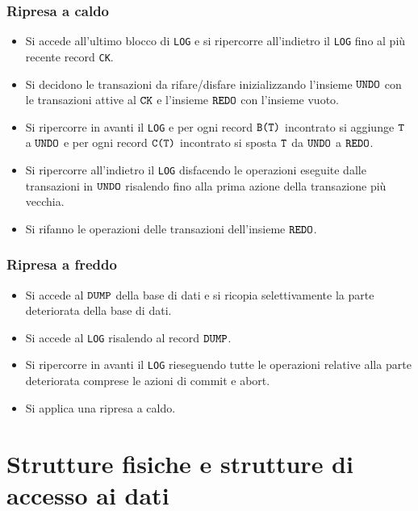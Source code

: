 \documentclass[oneside,a4paper,11pt]{book}
\theoremstyle{italicstyle}
\theoremstyle{normStyle}
\begin{document}
\subsection{Ripresa a caldo}
\begin{itemize}
    \item Si accede all'ultimo blocco di \verb|LOG| e si ripercorre all'indietro il \verb|LOG| 
    fino al più recente record \verb|CK|.
    \item Si decidono le transazioni da rifare/disfare inizializzando l'insieme $\verb|UNDO|$ con 
    le transazioni attive al $\verb|CK|$ e l'insieme $\verb|REDO|$ con l'insieme vuoto.
    \item Si ripercorre in avanti il \verb|LOG| e per ogni record $\verb|B(T)|$ incontrato 
    si aggiunge $\verb|T|$ a $\verb|UNDO|$ e per ogni record $\verb|C(T)|$ incontrato si sposta $\verb|T|$ da $\verb|UNDO|$ a $\verb|REDO|$.
    \item Si ripercorre all’indietro il \verb|LOG| disfacendo le operazioni eseguite dalle transazioni in 
    $\verb|UNDO|$ risalendo fino alla prima azione della transazione più vecchia.
    \item Si rifanno le operazioni delle transazioni dell'insieme $\verb|REDO|$.
\end{itemize}
\subsection{Ripresa a freddo}
\begin{itemize}
    \item Si accede al $\verb|DUMP|$ della base di dati e si ricopia selettivamente la 
    parte deteriorata della base di dati.
    \item Si accede al \verb|LOG| risalendo al record $\verb|DUMP|$.
    \item Si ripercorre in avanti il \verb|LOG| rieseguendo tutte le operazioni relative alla parte deteriorata
    comprese le azioni di commit e abort.
    \item Si applica una ripresa a caldo.
\end{itemize}
\chapter{Strutture fisiche e strutture di accesso ai dati}
\end{document}
